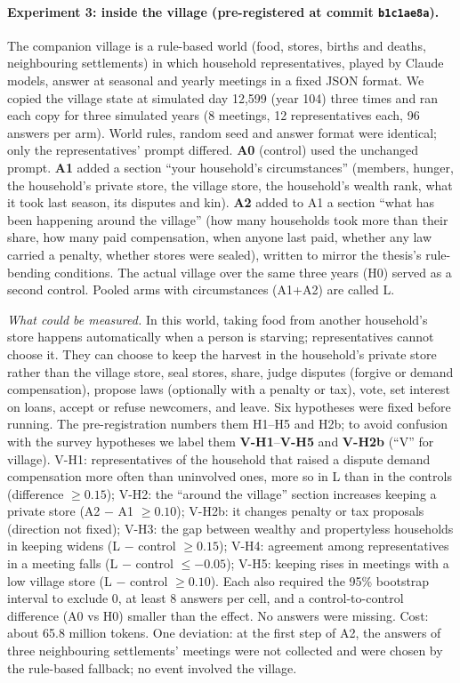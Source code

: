 \documentclass[11pt]{article}
\begin{document}
\paragraph{Experiment 3: inside the village (pre-registered at commit \texttt{b1c1ae8a}).}
The companion village \citep{tanohata2026village} is a rule-based world (food, stores, births and deaths, neighbouring settlements) in which household representatives, played by Claude models, answer at seasonal and yearly meetings in a fixed JSON format. We copied the village state at simulated day 12{,}599 (year 104) three times and ran each copy for three simulated years (8 meetings, 12 representatives each, 96 answers per arm). World rules, random seed and answer format were identical; only the representatives' prompt differed. \textbf{A0} (control) used the unchanged prompt. \textbf{A1} added a section ``your household's circumstances'' (members, hunger, the household's private store, the village store, the household's wealth rank, what it took last season, its disputes and kin). \textbf{A2} added to A1 a section ``what has been happening around the village'' (how many households took more than their share, how many paid compensation, when anyone last paid, whether any law carried a penalty, whether stores were sealed), written to mirror the thesis's rule-bending conditions. The actual village over the same three years (H0) served as a second control. Pooled arms with circumstances (A1+A2) are called L.

\emph{What could be measured.} In this world, taking food from another household's store happens automatically when a person is starving; representatives cannot choose it. They can choose to keep the harvest in the household's private store rather than the village store, seal stores, share, judge disputes (forgive or demand compensation), propose laws (optionally with a penalty or tax), vote, set interest on loans, accept or refuse newcomers, and leave. Six hypotheses were fixed before running. The pre-registration numbers them H1--H5 and H2b; to avoid confusion with the survey hypotheses we label them \textbf{V-H1}--\textbf{V-H5} and \textbf{V-H2b} (``V'' for village). V-H1: representatives of the household that raised a dispute demand compensation more often than uninvolved ones, more so in L than in the controls (difference $\ge 0.15$); V-H2: the ``around the village'' section increases keeping a private store (A2 $-$ A1 $\ge 0.10$); V-H2b: it changes penalty or tax proposals (direction not fixed); V-H3: the gap between wealthy and propertyless households in keeping widens (L $-$ control $\ge 0.15$); V-H4: agreement among representatives in a meeting falls (L $-$ control $\le -0.05$); V-H5: keeping rises in meetings with a low village store (L $-$ control $\ge 0.10$). Each also required the 95\% bootstrap interval to exclude 0, at least 8 answers per cell, and a control-to-control difference (A0 vs H0) smaller than the effect. No answers were missing. Cost: about 65.8 million tokens. One deviation: at the first step of A2, the answers of three neighbouring settlements' meetings were not collected and were chosen by the rule-based fallback; no event involved the village.
\end{document}
